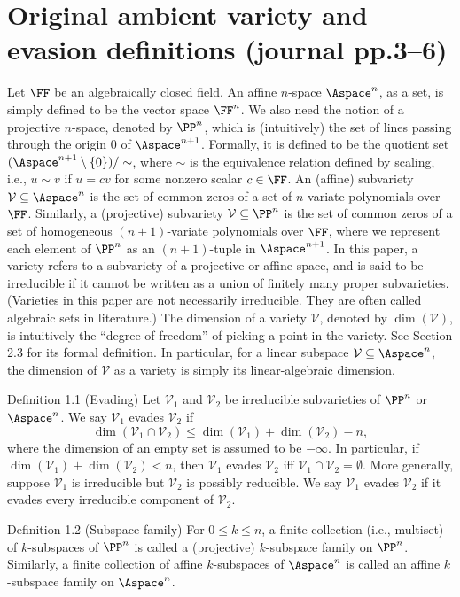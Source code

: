 \section*{Original ambient variety and evasion definitions (journal pp.3--6)}
Let $\FF$ be an algebraically closed field. An affine $n$-space $\Aspace^n$, as a set, is simply defined to be the vector space $\FF^n$. We also need the notion of a projective $n$-space, denoted by $\PP^n$, which is (intuitively) the set of lines passing through the origin $0$ of $\Aspace^{n+1}$. Formally, it is defined to be the quotient set $(\Aspace^{n+1}\setminus\{0\})/\sim$, where $\sim$ is the equivalence relation defined by scaling, i.e., $u\sim v$ if $u=cv$ for some nonzero scalar $c\in\FF$.
An (affine) subvariety $\mathcal V\subseteq\Aspace^n$ is the set of common zeros of a set of $n$-variate polynomials over $\FF$. Similarly, a (projective) subvariety $\mathcal V\subseteq\PP^n$ is the set of common zeros of a set of homogeneous $(n+1)$-variate polynomials over $\FF$, where we represent each element of $\PP^n$ as an $(n+1)$-tuple in $\Aspace^{n+1}$. In this paper, a variety refers to a subvariety of a projective or affine space, and is said to be irreducible if it cannot be written as a union of finitely many proper subvarieties. (Varieties in this paper are not necessarily irreducible. They are often called algebraic sets in literature.)
The dimension of a variety $\mathcal V$, denoted by $\dim(\mathcal V)$, is intuitively the ``degree of freedom'' of picking a point in the variety. See Section 2.3 for its formal definition. In particular, for a linear subspace $\mathcal V\subseteq\Aspace^n$, the dimension of $\mathcal V$ as a variety is simply its linear-algebraic dimension.
\begin{result}{Definition 1.1 (Evading)}
Let $\mathcal V_1$ and $\mathcal V_2$ be irreducible subvarieties of $\PP^n$ or $\Aspace^n$. We say $\mathcal V_1$ evades $\mathcal V_2$ if
\[\dim(\mathcal V_1\cap\mathcal V_2)\le\dim(\mathcal V_1)+\dim(\mathcal V_2)-n,\]
where the dimension of an empty set is assumed to be $-\infty$. In particular, if $\dim(\mathcal V_1)+\dim(\mathcal V_2)<n$, then $\mathcal V_1$ evades $\mathcal V_2$ iff $\mathcal V_1\cap\mathcal V_2=\emptyset$.
More generally, suppose $\mathcal V_1$ is irreducible but $\mathcal V_2$ is possibly reducible. We say $\mathcal V_1$ evades $\mathcal V_2$ if it evades every irreducible component of $\mathcal V_2$.
\end{result}
\begin{result}{Definition 1.2 (Subspace family)}
For $0\le k\le n$, a finite collection (i.e., multiset) of $k$-subspaces of $\PP^n$ is called a (projective) $k$-subspace family on $\PP^n$. Similarly, a finite collection of affine $k$-subspaces of $\Aspace^n$ is called an affine $k$-subspace family on $\Aspace^n$.
\end{result}
